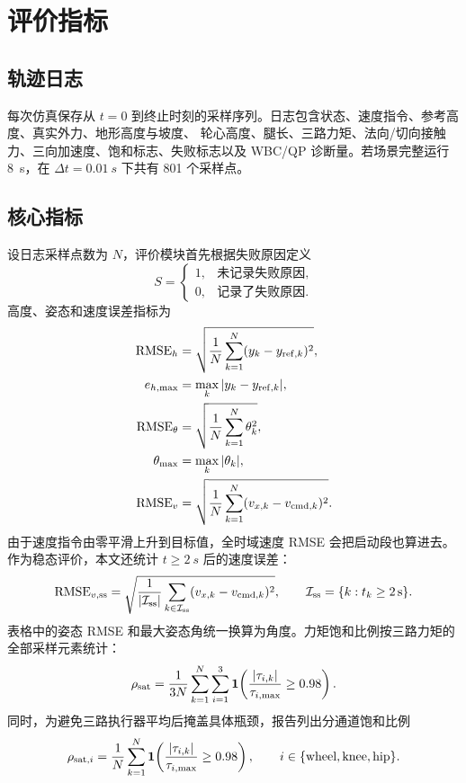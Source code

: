 \documentclass[UTF8,12pt,a4paper,fontset=none]{ctexart}
\begin{document}
\section{评价指标}

\subsection{轨迹日志}
每次仿真保存从 $t=0$ 到终止时刻的采样序列。日志包含状态、速度指令、参考高度、真实外力、地形高度与坡度、
轮心高度、腿长、三路力矩、法向/切向接触力、三向加速度、饱和标志、失败标志以及 WBC/QP 诊断量。若场景完整运行
\SI{8}{s}，在 $\Delta t=\SI{0.01}{s}$ 下共有 801 个采样点。

\subsection{核心指标}
设日志采样点数为 $N$，评价模块首先根据失败原因定义
\begin{equation}
S=\begin{cases}
1,&\text{未记录失败原因},\\
0,&\text{记录了失败原因}.
\end{cases}
\end{equation}
高度、姿态和速度误差指标为
\begin{align}
\mathrm{RMSE}_h&=\sqrt{\frac{1}{N}\sum_{k=1}^{N}(y_k-y_{{\rm ref},k})^2},\\
e_{h,\max}&=\max_k|y_k-y_{{\rm ref},k}|,\\
\mathrm{RMSE}_\theta&=\sqrt{\frac{1}{N}\sum_{k=1}^{N}\theta_k^2},\\
\theta_{\max}&=\max_k|\theta_k|,\\
\mathrm{RMSE}_v&=\sqrt{\frac{1}{N}\sum_{k=1}^{N}(v_{x,k}-v_{{\rm cmd},k})^2}.
\end{align}
由于速度指令由零平滑上升到目标值，全时域速度 RMSE 会把启动段也算进去。作为稳态评价，本文还统计
$t\ge\SI{2}{s}$ 后的速度误差：
\begin{equation}
\mathrm{RMSE}_{v,\rm ss}=
\sqrt{\frac{1}{|\mathcal I_{\rm ss}|}\sum_{k\in\mathcal I_{\rm ss}}
(v_{x,k}-v_{{\rm cmd},k})^2},\qquad
\mathcal I_{\rm ss}=\{k:t_k\ge\SI{2}{s}\}.
\end{equation}
表格中的姿态 RMSE 和最大姿态角统一换算为角度。力矩饱和比例按三路力矩的全部采样元素统计：
\begin{equation}
\rho_{\rm sat}=
\frac{1}{3N}\sum_{k=1}^{N}\sum_{i=1}^{3}
\mathbf 1\!\left(\frac{|\tau_{i,k}|}{\tau_{i,\max}}\ge0.98\right).
\end{equation}
同时，为避免三路执行器平均后掩盖具体瓶颈，报告列出分通道饱和比例
\begin{equation}
\rho_{{\rm sat},i}=
\frac{1}{N}\sum_{k=1}^{N}
\mathbf 1\!\left(\frac{|\tau_{i,k}|}{\tau_{i,\max}}\ge0.98\right),
\qquad i\in\{\text{wheel},\text{knee},\text{hip}\}.
\end{equation}
\end{document}
